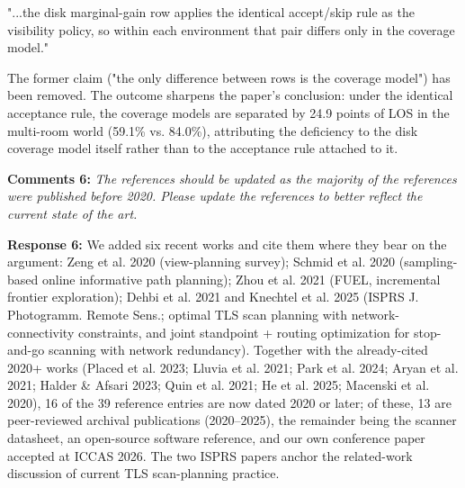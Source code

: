 \documentclass[11pt]{article}
\begin{document}
"...the disk marginal-gain row applies the identical accept/skip rule as the visibility policy, so within each environment that pair differs only in the coverage model."

The former claim ("the only difference between rows is the coverage model") has been removed. The outcome sharpens the paper's conclusion: under the identical acceptance rule, the coverage models are separated by 24.9 points of LOS in the multi-room world (59.1\% vs. 84.0\%), attributing the deficiency to the disk coverage model itself rather than to the acceptance rule attached to it.

\medskip

\textbf{Comments 6:} \emph{\emph{The references should be updated as the majority of the references were published before 2020. Please update the references to better reflect the current state of the art.}}

\textbf{Response 6:} We added six recent works and cite them where they bear on the argument: Zeng et al. 2020 (view-planning survey); Schmid et al. 2020 (sampling-based online informative path planning); Zhou et al. 2021 (FUEL, incremental frontier exploration); Dehbi et al. 2021 and Knechtel et al. 2025 (ISPRS J. Photogramm. Remote Sens.; optimal TLS scan planning with network-connectivity constraints, and joint standpoint + routing optimization for stop-and-go scanning with network redundancy). Together with the already-cited 2020+ works (Placed et al. 2023; Lluvia et al. 2021; Park et al. 2024; Aryan et al. 2021; Halder \& Afsari 2023; Quin et al. 2021; He et al. 2025; Macenski et al. 2020), 16 of the 39 reference entries are now dated 2020 or later; of these, 13 are peer-reviewed archival publications (2020–2025), the remainder being the scanner datasheet, an open-source software reference, and our own conference paper accepted at ICCAS 2026. The two ISPRS papers anchor the related-work discussion of current TLS scan-planning practice.

\medskip
\end{document}
